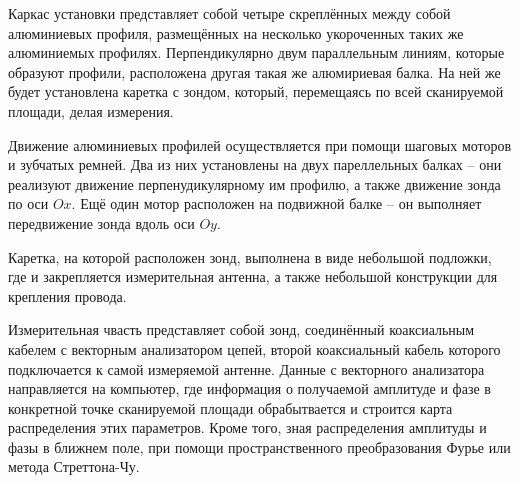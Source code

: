 \documentclass{article}
\begin{document}
Каркас установки представляет собой четыре скреплённых между собой алюминиевых профиля, размещённых на несколько укороченных таких же алюминиемых профилях. Перпендикулярно двум параллельным линиям, которые образуют профили, расположена другая такая же алюмириевая балка. На ней же будет установлена каретка с зондом, который, перемещаясь по всей сканируемой площади, делая измерения.

Движение алюминиевых профилей осуществляется при помощи шаговых моторов и зубчатых ремней. Два из них установлены на двух пареллельных балках -- они реализуют движение перпенудикулярному им профилю, а также движение зонда по оси $Ox$. Ещё один мотор расположен на подвижной балке -- он выполняет передвижение зонда вдоль оси $Oy$.

Каретка, на которой расположен зонд, выполнена в виде небольшой подложки, где и закрепляется измерительная антенна, а также небольшой конструкции для крепления провода.

Измерительная чвасть представляет собой зонд, соединённый коаксиальным кабелем с векторным анализатором цепей, второй коаксиальный кабель которого подключается к самой измеряемой антенне. Данные с векторного анализатора направляется на компьютер, где информация о получаемой амплитуде и фазе в конкретной точке сканируемой площади обрабытвается и строится карта распределения этих параметров. Кроме того, зная распределения амплитуды и фазы в ближнем поле, при помощи пространственного преобразования Фурье или метода Стреттона-Чу.
\end{document}
